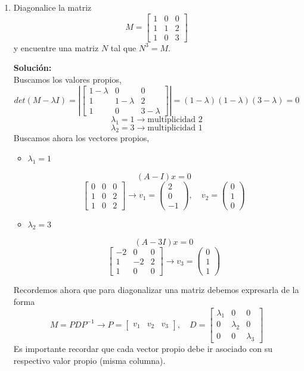 \documentclass[12pt]{article}
\newenvironment{solucion}
{\begin{mdframed}[backgroundcolor=black!10]
		{\bf Solución:}\\
	}
	{
	\end{mdframed}
}
\newenvironment{preguntas}
{\begin{enumerate}\itemsep12pt
	}
	{
	\end{enumerate}
}
\newcommand{\ra}{\rightarrow}
\begin{document}
\begin{preguntas}
\begin{solucion}
		Finalmente, como la multiplicidad algebraica es igual a la multiplicidad geométrica, la matriz es diagonalizable.
\end{solucion}
\item Diagonalice la matriz
	$$M = \begin{bmatrix}
	1 & 0 & 0\\
	1 & 1 & 2 \\
	1 & 0 & 3
	\end{bmatrix}$$
	y encuentre una matriz $N$ tal que $N^3 = M$.
\begin{solucion}
Buscamos los valores propios,
		$$det(M-\lambda I) = \left|\begin{bmatrix}
		1-\lambda & 0 & 0\\
		1 & 1-\lambda & 2 \\
		1 & 0 & 3-\lambda
		\end{bmatrix}\right|
		= (1-\lambda)(1-\lambda)(3-\lambda) = 0$$
		$$\lambda_1 = 1 \ra \text{multiplicidad 2}$$
		$$\lambda_2 = 3 \ra \text{multiplicidad 1}$$
		Buscamos ahora los vectores propios,
		\begin{itemize}
			\item $\lambda_1 = 1$
			
			$$(A-I)x = 0$$
			$$\begin{bmatrix}
			0 & 0 & 0\\
			1 & 0 & 2 \\
			1 & 0 & 2
			\end{bmatrix} \ra v_1 = \begin{pmatrix}
			2 \\ 0 \\ -1
			\end{pmatrix}, \quad
			v_2 = \begin{pmatrix}
			0 \\ 1 \\ 0
			\end{pmatrix}$$
			
			\item $\lambda_2 = 3$
			
			$$(A-3I)x = 0$$
			$$\begin{bmatrix}
			-2 & 0 & 0\\
			1 & -2 & 2 \\
			1 & 0 & 0
			\end{bmatrix} \ra v_3 = \begin{pmatrix}
			0 \\ 1 \\ 1
			\end{pmatrix}$$
		\end{itemize}
			Recordemos ahora que para diagonalizar una matriz debemos expresarla de la forma
			$$M = PDP^{-1} \ra P = \begin{bmatrix}
			v_1 & v_2 & v_3
			\end{bmatrix}, \quad
			D = \begin{bmatrix}
			\lambda_1 & 0 & 0 \\
			0 & \lambda_2 & 0 \\
			0 & 0 & \lambda_3
			\end{bmatrix}$$
			Es importante recordar que cada vector propio debe ir asociado con su respectivo valor propio (misma columna).
			

\end{solucion}
\end{preguntas}
\end{document}
